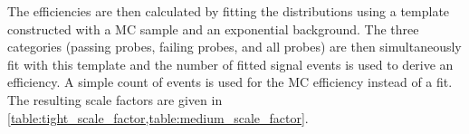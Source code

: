 The efficiencies are then calculated by fitting the \mee distributions using a
template constructed with a \Ztoee MC sample and an exponential background. The
three categories (passing probes, failing probes, and all probes) are then
simultaneously fit with this template and the number of fitted signal events is
used to derive an efficiency. A simple count of events is used for the MC
efficiency instead of a fit. The resulting scale factors are given in
\cref{table:tight_scale_factor,table:medium_scale_factor}.




